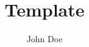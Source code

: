 \documentclass[notitlepage]{article}
\title{Template}
\author{John Doe}
\begin{document}
\cite{*}

%

\end{document}
